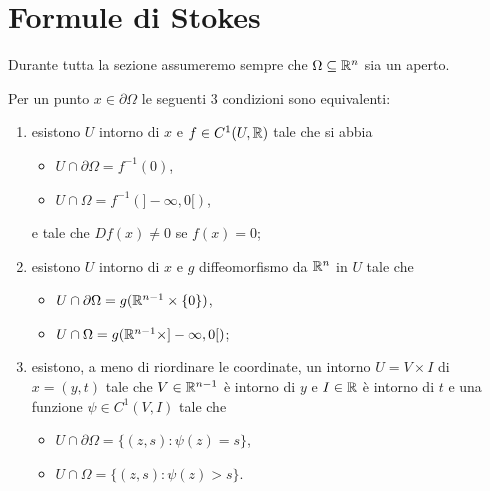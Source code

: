 \section{Formule di Stokes}\label{sezione:FormuleStokes}

Durante tutta la sezione assumeremo sempre che $\Omega\subseteq\mathbb R^n$ sia un aperto.

\begin{theorem}\label{thm:PtRegEquiv}
	Per un punto $x\in \partial \Omega$ le seguenti $3$ condizioni sono equivalenti:
	\begin{enumerate}
		\item esistono $U$ intorno di $x$ e $f\in C^1(U,\mathbb R)$ tale che si abbia
			\begin{itemize}
				\item $U\cap \partial \Omega=f^{-1}(0)$,
				\item $U\cap \Omega=f^{-1}(]-\infty,0[)$,
			\end{itemize}
			e tale che $Df(x)\neq 0$ se $f(x)=0$;\label{PRE:i}
		\item esistono $U$ intorno di $x$ e $g$ diffeomorfismo da $\mathbb R^n$ in $U$ tale che\label{PRE:ii}
			\begin{itemize}
				\item $U\cap \partial \Omega = g(\mathbb R^{n-1}\times\{0\})$,
				\item $U\cap \Omega = g(\mathbb R^{n-1}\times]-\infty,0[)$;
			\end{itemize}
		\item esistono, a meno di riordinare le coordinate, un intorno $U=V\times I$ di $x=(y,t)$ tale che $V\in\mathbb R^{n-1}$ è intorno di $y$
			e $I\in\mathbb R$ è intorno di $t$ e una funzione $\psi\in C^1(V,I)$ tale che
			\begin{itemize}
				\item $U\cap \partial \Omega = \{(z,s):\psi(z)=s\}$,
				\item $U\cap \Omega = \{(z,s):\psi(z)>s\}$.
			\end{itemize}\label{PRE:iii}
	\end{enumerate}
\end{theorem}

